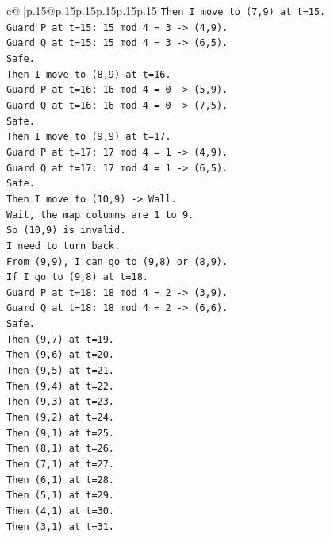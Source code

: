 \documentclass{article}
\begin{document}
{\begin{supertabular}{c@{$\;$}|p{.15\linewidth}@{}p{.15\linewidth}p{.15\linewidth}p{.15\linewidth}p{.15\linewidth}p{.15\linewidth}}
{{{\texttt{Then I move to (7,9) at t=15.} \\
\texttt{Guard P at t=15: 15 mod 4 = 3 {-}> (4,9).} \\
\texttt{Guard Q at t=15: 15 mod 4 = 3 {-}> (6,5).} \\
\texttt{Safe.} \\
\texttt{Then I move to (8,9) at t=16.} \\
\texttt{Guard P at t=16: 16 mod 4 = 0 {-}> (5,9).} \\
\texttt{Guard Q at t=16: 16 mod 4 = 0 {-}> (7,5).} \\
\texttt{Safe.} \\
\texttt{Then I move to (9,9) at t=17.} \\
\texttt{Guard P at t=17: 17 mod 4 = 1 {-}> (4,9).} \\
\texttt{Guard Q at t=17: 17 mod 4 = 1 {-}> (6,5).} \\
\texttt{Safe.} \\
\texttt{Then I move to (10,9) {-}> Wall.} \\
\texttt{Wait, the map columns are 1 to 9.} \\
\texttt{So (10,9) is invalid.} \\
\texttt{I need to turn back.} \\
\texttt{From (9,9), I can go to (9,8) or (8,9).} \\
\texttt{If I go to (9,8) at t=18.} \\
\texttt{Guard P at t=18: 18 mod 4 = 2 {-}> (3,9).} \\
\texttt{Guard Q at t=18: 18 mod 4 = 2 {-}> (6,6).} \\
\texttt{Safe.} \\
\texttt{Then (9,7) at t=19.} \\
\texttt{Then (9,6) at t=20.} \\
\texttt{Then (9,5) at t=21.} \\
\texttt{Then (9,4) at t=22.} \\
\texttt{Then (9,3) at t=23.} \\
\texttt{Then (9,2) at t=24.} \\
\texttt{Then (9,1) at t=25.} \\
\texttt{Then (8,1) at t=26.} \\
\texttt{Then (7,1) at t=27.} \\
\texttt{Then (6,1) at t=28.} \\
\texttt{Then (5,1) at t=29.} \\
\texttt{Then (4,1) at t=30.} \\
\texttt{Then (3,1) at t=31.} \\
}}}
\end{supertabular}}
\end{document}
